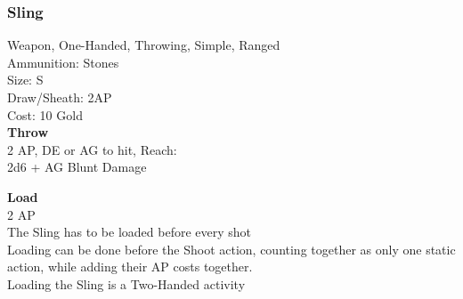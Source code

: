 \subsubsection{Sling}\label{weapon:sling}
Weapon, One-Handed, Throwing, Simple, Ranged\\
Ammunition: Stones\\
Size: S\\
Draw/Sheath: 2AP\\
Cost: 10 Gold\\

\textbf{Throw}\\
2 AP, DE or AG to hit,  Reach:\\
2d6 + \texttimes AG Blunt Damage

\textbf{Load}\\
2 AP\\
The Sling has to be loaded before every shot\\
Loading can be done before the Shoot action, counting together as only one static action, while adding their AP costs together.\\
Loading the Sling is a Two-Handed activity
